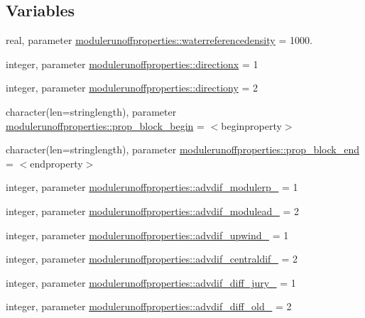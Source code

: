 \subsection*{Variables}
\begin{DoxyCompactItemize}
\item 
real, parameter \mbox{\hyperlink{namespacemodulerunoffproperties_af591dffde879824675224a9185932faf}{modulerunoffproperties\+::waterreferencedensity}} = 1000.
\item 
integer, parameter \mbox{\hyperlink{namespacemodulerunoffproperties_ae250a208e96221e662f5c2b12c6d036a}{modulerunoffproperties\+::directionx}} = 1
\item 
integer, parameter \mbox{\hyperlink{namespacemodulerunoffproperties_a158dd89aefcdbd0eb8d119550d0da31d}{modulerunoffproperties\+::directiony}} = 2
\item 
character(len=stringlength), parameter \mbox{\hyperlink{namespacemodulerunoffproperties_a88c569a198ba58f328cbd78702f9b739}{modulerunoffproperties\+::prop\+\_\+block\+\_\+begin}} = \textquotesingle{}$<$beginproperty$>$\textquotesingle{}
\item 
character(len=stringlength), parameter \mbox{\hyperlink{namespacemodulerunoffproperties_a8f76f273640950bb09a9177eeeba3f79}{modulerunoffproperties\+::prop\+\_\+block\+\_\+end}} = \textquotesingle{}$<$endproperty$>$\textquotesingle{}
\item 
integer, parameter \mbox{\hyperlink{namespacemodulerunoffproperties_a760fc37f3c2a03e5f063430e741cc541}{modulerunoffproperties\+::advdif\+\_\+modulerp\+\_\+}} = 1
\item 
integer, parameter \mbox{\hyperlink{namespacemodulerunoffproperties_a33404d52cb5232cc7771cec95096ed37}{modulerunoffproperties\+::advdif\+\_\+modulead\+\_\+}} = 2
\item 
integer, parameter \mbox{\hyperlink{namespacemodulerunoffproperties_a44ce036cbb5b05492ce8077c0669726e}{modulerunoffproperties\+::advdif\+\_\+upwind\+\_\+}} = 1
\item 
integer, parameter \mbox{\hyperlink{namespacemodulerunoffproperties_a543a15f324c935241167973309384dcb}{modulerunoffproperties\+::advdif\+\_\+centraldif\+\_\+}} = 2
\item 
integer, parameter \mbox{\hyperlink{namespacemodulerunoffproperties_af5214297560b3c3bd07eac30d55b87e5}{modulerunoffproperties\+::advdif\+\_\+diff\+\_\+jury\+\_\+}} = 1
\item 
integer, parameter \mbox{\hyperlink{namespacemodulerunoffproperties_a9cda2535b4c47700d56c7acd2ccda7fd}{modulerunoffproperties\+::advdif\+\_\+diff\+\_\+old\+\_\+}} = 2

\end{DoxyCompactItemize}
